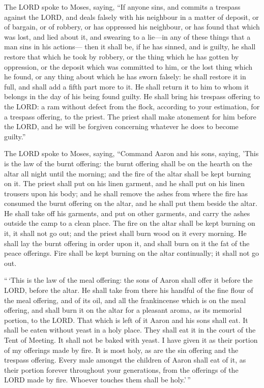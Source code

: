  The LORD spoke to Moses, saying,  ``If anyone
sins, and commits a trespass against the LORD, and deals falsely with
his neighbour in a matter of deposit, or of bargain, or of robbery, or
has oppressed his neighbour,  or has found that which was
lost, and lied about it, and swearing to a lie---in any of these things
that a man sins in his actions---  then it shall be, if he
has sinned, and is guilty, he shall restore that which he took by
robbery, or the thing which he has gotten by oppression, or the deposit
which was committed to him, or the lost thing which he found,
 or any thing about which he has sworn falsely: he shall
restore it in full, and shall add a fifth part more to it. He shall
return it to him to whom it belongs in the day of his being found
guilty.  He shall bring his trespass offering to the LORD: a
ram without defect from the flock, according to your estimation, for a
trespass offering, to the priest.  The priest shall make
atonement for him before the LORD, and he will be forgiven concerning
whatever he does to become guilty.''

 The LORD spoke to Moses, saying,  ``Command
Aaron and his sons, saying, 'This is the law of the burnt offering: the
burnt offering shall be on the hearth on the altar all night until the
morning; and the fire of the altar shall be kept burning on it.
 The priest shall put on his linen garment, and he shall
put on his linen trousers upon his body; and he shall remove the ashes
from where the fire has consumed the burnt offering on the altar, and he
shall put them beside the altar.  He shall take off his
garments, and put on other garments, and carry the ashes outside the
camp to a clean place.  The fire on the altar shall be kept
burning on it, it shall not go out; and the priest shall burn wood on it
every morning. He shall lay the burnt offering in order upon it, and
shall burn on it the fat of the peace offerings.  Fire
shall be kept burning on the altar continually; it shall not go out.

 ``\,`This is the law of the meal offering: the sons of
Aaron shall offer it before the LORD, before the altar.  He
shall take from there his handful of the fine flour of the meal
offering, and of its oil, and all the frankincense which is on the meal
offering, and shall burn it on the altar for a pleasant aroma, as its
memorial portion, to the LORD.  That which is left of it
Aaron and his sons shall eat. It shall be eaten without yeast in a holy
place. They shall eat it in the court of the Tent of Meeting.
 It shall not be baked with yeast. I have given it as their
portion of my offerings made by fire. It is most holy, as are the sin
offering and the trespass offering.  Every male amongst the
children of Aaron shall eat of it, as their portion forever throughout
your generations, from the offerings of the LORD made by fire. Whoever
touches them shall be holy.'\,''

